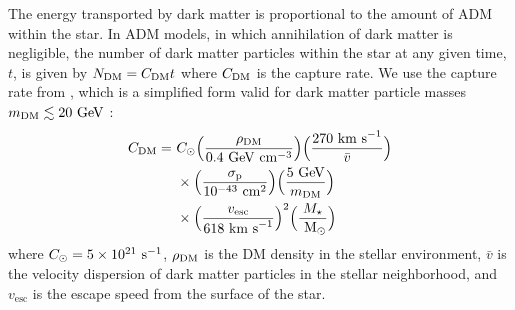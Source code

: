 \documentclass[useAMS,usenatbib]{mnras}
\begin{document}
  The energy transported by dark matter is proportional to the amount of ADM within the star. 
  In ADM models, in which annihilation of dark matter is negligible, the number 
  of dark matter particles within the star at any given time, $t$, is given by $N_{\mathrm{DM}} = C_{\mathrm{DM}} t$ 
  where $C_{\mathrm{DM}}$ is the capture rate. We use the capture rate from \citet{Zentner2011AsymmetricDwarfs}, 
  which is a simplified form valid for dark matter particle masses 
  $m_{\mathrm{DM}} \lesssim 20 \ \mathrm{GeV}$ \citep[see][ for more complete capture rates]{Gould1992CosmologicalAnnihilations,Zentner2009High-energySun}:
%
  \begin{align}
  \begin{split}
    \label{eq:capturerate}
    C_{\mathrm{DM}} =\ & C_{\odot}
    \Big(\frac{\rho_{\mathrm{DM}}}{0.4 \ \mathrm{GeV} \ \mathrm{cm}^{-3}}\Big)
    \Big(\frac{270 \ \mathrm{km\ s}^{-1}}{\bar{v}}\Big) \\
    & \times \Big(\frac{\sigma_{\mathrm{p}}}{10^{-43} \ \mathrm{cm}^2}\Big) \Big(\frac{5 \ \mathrm{GeV}}{m_{\mathrm{DM}}}\Big) \\
    & \times \Big(\frac{v_{\mathrm{esc}}}{618 \ \mathrm{km\ s}^{-1}}\Big)^2
    \Big(\frac{M_{\star}}{\ \mathrm{M}_{\odot}}\Big)
  \end{split}
  \end{align}
%
  where $C_{\odot} = 5 \times 10^{21} \ \mathrm{s}^{-1}$, 
  $\rho_{\mathrm{DM}}$ is the DM density in the stellar environment,
  $\bar{v}$ is the velocity dispersion of dark matter particles 
  in the stellar neighborhood, and $v_{\mathrm{esc}}$ is the escape speed from the 
  surface of the star.
\end{document}
